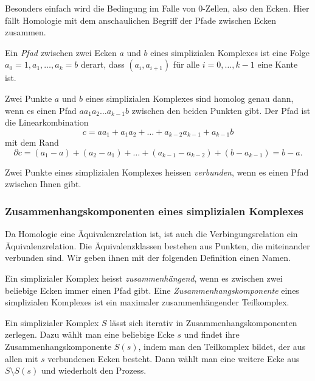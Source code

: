 Besonders einfach wird die Bedingung im Falle von $0$-Zellen, also
den Ecken.
Hier fällt Homologie mit dem anschaulichen Begriff der Pfade zwischen
Ecken zusammen.

\begin{definition}[Pfad]
Ein \emph{Pfad} zwischen zwei Ecken $a$ und $b$ eines simplizialen Komplexes
ist eine Folge $a_0=1,a_1,\dots,a_k=b$ derart, dass $(a_i,a_{i+1})$
für alle $i=0,\dots,k-1$ eine Kante ist.
\end{definition}

Zwei Punkte $a$ und $b$ eines simplizialen Komplexes sind homolog
genau dann, wenn es einen Pfad $aa_1a_2\dots a_{k-1}b$ zwischen
den beiden Punkten gibt.
Der Pfad ist die Linearkombination
\[
c = aa_1 + a_1a_2 + \dots + a_{k-2}a_{k-1} + a_{k-1}b
\]
mit dem Rand
\[
\partial c
=
(a_1 - a) + (a_2-a_1) + \dots + (a_{k-1}-a_{k-2}) + (b-a_{k-1})
=
b-a.
\]

\begin{definition}
Zwei Punkte eines simplizialen Komplexes heissen \emph{verbunden},
wenn es einen Pfad zwischen Ihnen gibt.
\end{definition}

%
%
\subsubsection{Zusammenhangskomponenten eines simplizialen Komplexes}
Da Homologie eine Äquivalenzrelation ist, ist auch die Verbingungsrelation
ein Äquivalenzrelation.
Die Äquivalenzklassen bestehen aus Punkten, die miteinander verbunden
sind.
Wir geben ihnen mit der folgenden Definition einen Namen.

\begin{definition}[Zusammenhang]
Ein simplizialer Komplex heisst \emph{zusammenhängend}, wenn es zwischen
%
zwei beliebige Ecken immer einen Pfad gibt.
Eine \emph{Zusammenhangskomponente} eines simplizialen Komplexes ist ein
%
maximaler zusammenhängender Teilkomplex.
\end{definition}

Ein simplizialer Komplex $S$ lässt sich iterativ in
Zusammenhangskomponenten zerlegen.
Dazu wählt man eine beliebige Ecke $s$ und findet ihre
Zusammenhangskomponente $S(s)$, indem man den Teilkomplex bildet, der aus
allen mit $s$ verbundenen Ecken besteht.
Dann wählt man eine weitere Ecke aus $S\setminus S(s)$ und wiederholt
den Prozess.

